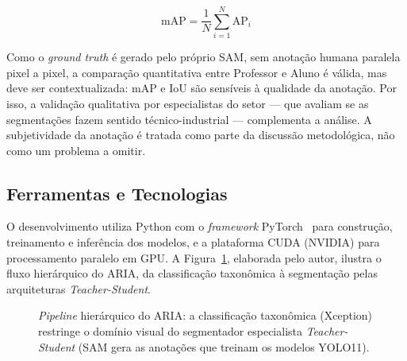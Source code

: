 \documentclass[12pt]{article}
\begin{document}
\begin{equation}
  \mathrm{mAP} = \frac{1}{N} \sum_{i=1}^{N} \mathrm{AP}_i
  \label{eq:map}
\end{equation}

Como o \textit{ground truth} é gerado pelo próprio SAM, sem anotação humana paralela pixel a pixel, a comparação quantitativa entre Professor e Aluno é válida, mas deve ser contextualizada: mAP e IoU são sensíveis à qualidade da anotação. Por isso, a validação qualitativa por especialistas do setor --- que avaliam se as segmentações fazem sentido técnico-industrial --- complementa a análise. A subjetividade da anotação é tratada como parte da discussão metodológica, não como um problema a omitir.

\subsection{Ferramentas e Tecnologias}

O desenvolvimento utiliza Python com o \textit{framework} PyTorch~\cite{pytorch_paszke2019} para construção, treinamento e inferência dos modelos, e a plataforma CUDA (NVIDIA) para processamento paralelo em GPU. A Figura~\ref{fig:arquitetura}, elaborada pelo autor, ilustra o fluxo hierárquico do ARIA, da classificação taxonômica à segmentação pelas arquiteturas \textit{Teacher-Student}.

\begin{figure}[ht]
  \centering
  \caption{\textit{Pipeline} hierárquico do ARIA: a classificação taxonômica
    (Xception) restringe o domínio visual do segmentador especialista
    \textit{Teacher-Student} (SAM gera as anotações que treinam os modelos
    YOLO11).}
  \label{fig:arquitetura}
\end{figure}
\end{document}
